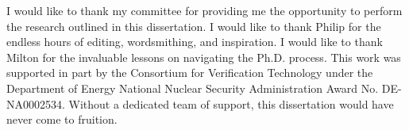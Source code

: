 \begin{acknowledgments}
    I would like to thank my committee for providing me the opportunity to perform the research outlined in this dissertation. I would like to thank Philip for the endless hours of editing, wordsmithing, and inspiration. I would like to thank Milton for the invaluable lessons on navigating the Ph.D. process. This work was supported in part by the Consortium for Verification Technology under the Department of Energy National Nuclear Security Administration Award No. DE-NA0002534. Without a dedicated team of support, this dissertation would have never come to fruition.
\end{acknowledgments}
